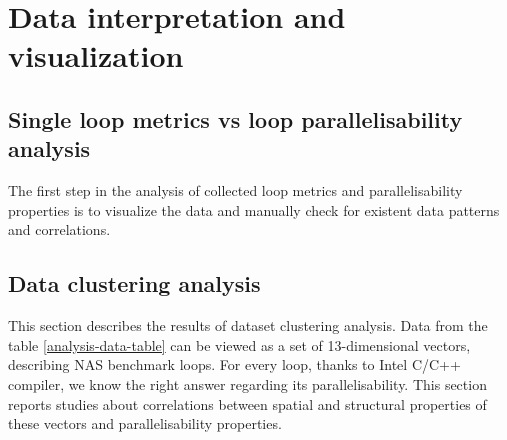 \section{Data interpretation and visualization}
\label{analysis-data-interpretation-and-visualization}
\subsection{Single loop metrics vs loop parallelisability analysis}
\qquad The first step in the analysis of collected loop metrics and parallelisability properties is to visualize the data and manually check for existent data patterns and correlations. 

\subsection{Data clustering analysis}
\label{analysis-data-clustering-analysis}
\qquad This section describes the results of dataset clustering analysis. Data from the table \ref{analysis-data-table} can be viewed as a set of 13-dimensional vectors, describing NAS benchmark loops. For every loop, thanks to Intel C/C++ compiler, we know the right answer regarding its parallelisability. This section reports studies about correlations between spatial and structural properties of these vectors and parallelisability properties.    

